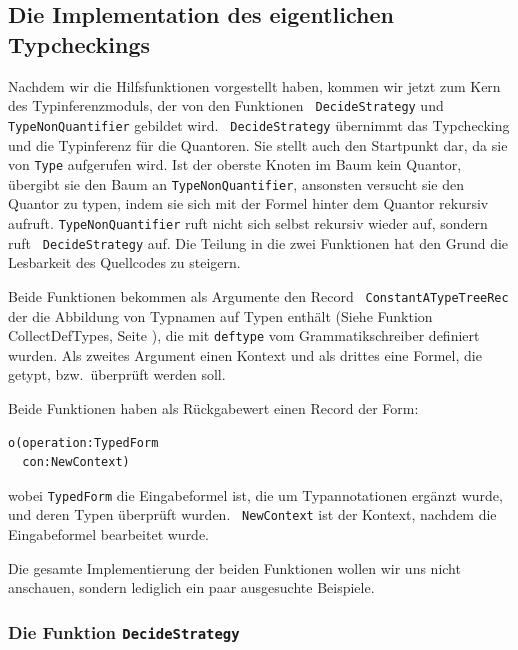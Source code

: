 \subsection{Die Implementation des eigentlichen Typcheckings}

Nachdem wir die Hilfsfunktionen vorgestellt haben, kommen wir jetzt zum
Kern des Typinferenzmoduls, der von den Funktionen {\tt
  DecideStrategy} und {\tt TypeNonQuantifier} gebildet wird.  {\tt
  DecideStrategy} \"ubernimmt das Typchecking und die Typinferenz
f\"ur die Quantoren. Sie stellt auch den Startpunkt dar, da sie von
{\tt Type} aufgerufen wird. Ist der oberste Knoten im Baum kein
Quantor, \"ubergibt sie den Baum an {\tt TypeNonQuantifier}, ansonsten
versucht sie den Quantor zu typen, indem sie sich mit der Formel
hinter dem Quantor rekursiv aufruft.  {\tt TypeNonQuantifier} ruft
nicht sich selbst rekursiv wieder auf, sondern ruft {\tt
  DecideStrategy} auf. Die Teilung in die zwei Funktionen hat den
Grund die Lesbarkeit des Quellcodes zu steigern.

Beide Funktionen bekommen als Argumente den Record {\tt
  ConstantATypeTreeRec} der die Abbildung von Typnamen auf Typen
enth\"alt (Siehe Funktion CollectDefTypes, Seite
\pageref{collectdeftypes}), die mit {\tt deftype} vom
Grammatikschreiber definiert wurden. Als zweites Argument einen
Kontext und als drittes eine Formel, die getypt, bzw.\ \"uberpr\"uft
werden soll.

Beide Funktionen haben als R\"uckgabewert einen Record der Form:
\begin{verbatim}
o(operation:TypedForm
  con:NewContext)
\end{verbatim}
wobei {\tt TypedForm} die Eingabeformel ist, die um Typannotationen
erg\"anzt wurde, und deren Typen \"uberpr\"uft wurden. {\tt
  NewContext} ist der Kontext, nachdem die Eingabeformel bearbeitet
wurde.

Die gesamte Implementierung der beiden Funktionen wollen wir uns nicht
anschauen, sondern lediglich ein paar ausgesuchte Beispiele.

\subsubsection{Die Funktion {\tt DecideStrategy}}

